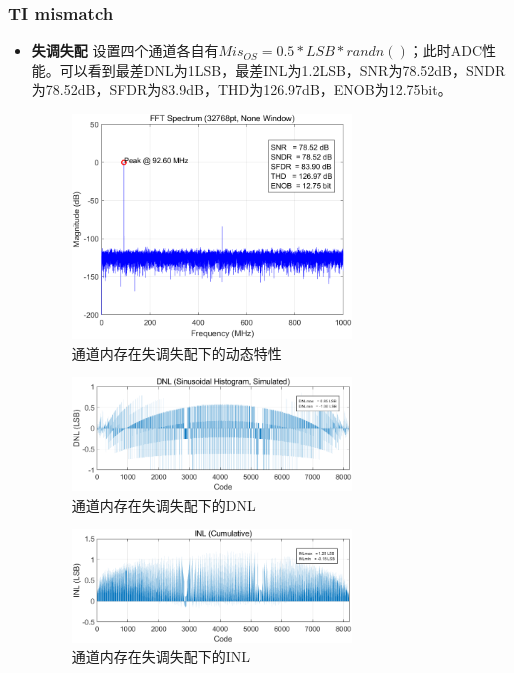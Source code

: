 \documentclass[cs4size,a4paper]{ctexart}
\numberwithin{equation}{section}
\numberwithin{table}{section}
\numberwithin{figure}{section}
\begin{document}
	\subsubsection{TI mismatch}
	\begin{itemize}
		\item \textbf{失调失配} 设置四个通道各自有$Mis_{OS} = 0.5 * LSB * randn()$；此时ADC性能。可以看到最差DNL为1LSB，最差INL为1.2LSB，SNR为78.52dB，SNDR为78.52dB，SFDR为83.9dB，THD为126.97dB，ENOB为12.75bit。

		\begin{figure}[H]
			\centering
			\includegraphics[width=0.7\textwidth]{pic/TIOS/DFT.png}
			\caption{通道内存在失调失配下的动态特性} 
		\end{figure}

		\begin{figure}[H]
			\centering
			\includegraphics[width=0.7\textwidth]{pic/TIOS/DNL.png}
			\caption{通道内存在失调失配下的DNL} 
		\end{figure}

		\begin{figure}[H]
			\centering
			\includegraphics[width=0.7\textwidth]{pic/TIOS/INL.png}
			\caption{通道内存在失调失配下的INL} 
		\end{figure}


\end{itemize}
\end{document}
